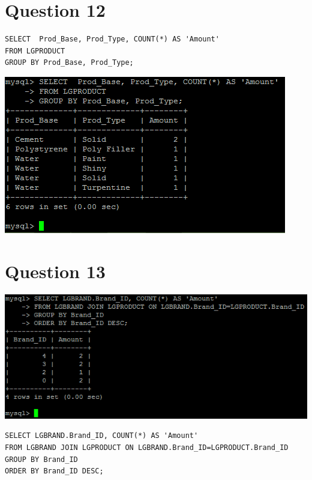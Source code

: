 \documentclass[a4paper,10pt]{article}
\begin{document}
\section*{Question 12}
\lstset{
            language=SQL,
            breaklines=true
            }
        \begin{lstlisting}[frame=single]
        SELECT  Prod_Base, Prod_Type, COUNT(*) AS 'Amount'
FROM LGPRODUCT
GROUP BY Prod_Base, Prod_Type;

        \end{lstlisting}
\includegraphics{Queries/Question_12/Question_12_Screenshot.PNG}
\section*{Question 13}
\includegraphics{Queries/Question_13/Question_13_screenshot.PNG}
\lstset{
            language=SQL,
            breaklines=true
            }
        \begin{lstlisting}[frame=single]
        SELECT LGBRAND.Brand_ID, COUNT(*) AS 'Amount'
FROM LGBRAND JOIN LGPRODUCT ON LGBRAND.Brand_ID=LGPRODUCT.Brand_ID
GROUP BY Brand_ID
ORDER BY Brand_ID DESC;

        \end{lstlisting}
\end{document}
